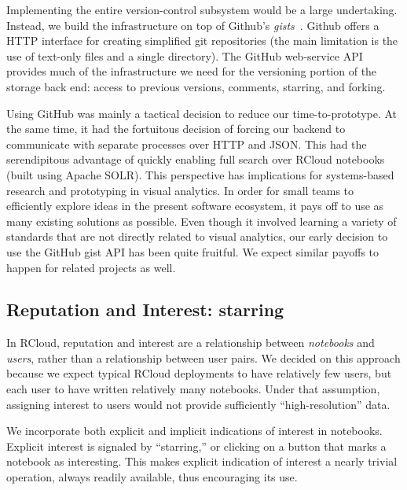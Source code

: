 Implementing the entire version-control subsystem would be a large
undertaking. Instead, we build the infrastructure on top of Github's
\emph{gists}~. Github offers a HTTP interface
for creating simplified git repositories (the main limitation is the
use of text-only files and a single directory). The GitHub web-service
API provides much of the infrastructure we need for the versioning
portion of the storage back end: access to previous versions,
comments, starring, and forking.

Using GitHub was mainly a tactical decision to reduce our
time-to-prototype. At the same time, it had the fortuitous decision of
forcing our backend to communicate with separate processes over HTTP
and JSON. This had the serendipitous advantage of quickly enabling
full search over RCloud notebooks (built using Apache SOLR).
%
This perspective has implications for
systems-based research and prototyping in visual analytics.
%
In order for small teams to efficiently explore ideas in the present
software ecosystem, it pays off to use as many existing solutions as
possible.
%
Even though it involved learning a variety of standards that are not
directly related to visual analytics, our early decision to use the
GitHub gist API has been quite fruitful. We expect similar payoffs to
happen for related projects as well.


\subsection{Reputation and Interest: starring\label{sec:starring}}

In RCloud, reputation and interest are a relationship between
\emph{notebooks} and \emph{users}, rather than a relationship between
user pairs. We decided on this approach because we expect typical
RCloud deployments to have relatively few users, but each user to have
written relatively many notebooks. Under that assumption, assigning
interest to users would not provide sufficiently ``high-resolution'' data.

We incorporate both explicit and implicit indications of interest
in notebooks. Explicit interest is signaled by ``starring,'' or
clicking on a button that marks a notebook as interesting.
This makes explicit indication of interest a nearly trivial operation,
always readily available, thus encouraging its use.

